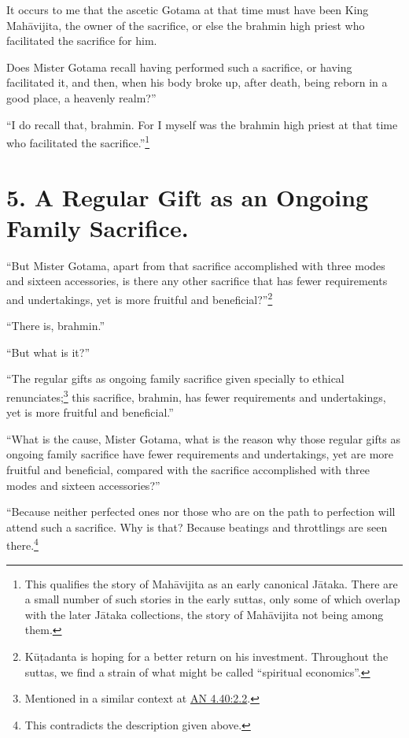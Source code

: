 \documentclass[12pt,openany]{book}%
\begin{document}
It occurs to me that the ascetic Gotama at that time must have been King \textsanskrit{Mahāvijita}, the owner of the sacrifice, or else the brahmin high priest who facilitated the sacrifice for him. 

Does Mister Gotama recall having performed such a sacrifice, or having facilitated it, and then, when his body broke up, after death, being reborn in a good place, a heavenly realm?” 

“I do recall that, brahmin. For I myself was the brahmin high priest at that time who facilitated the sacrifice.”\footnote{This qualifies the story of \textsanskrit{Mahāvijita} as an early canonical \textsanskrit{Jātaka}. There are a small number of such stories in the early suttas, only some of which overlap with the later \textsanskrit{Jātaka} collections, the story of \textsanskrit{Mahāvijita} not being among them. } 

\section*{5. A Regular Gift as an Ongoing Family Sacrifice. }

“But Mister Gotama, apart from that sacrifice accomplished with three modes and sixteen accessories, is there any other sacrifice that has fewer requirements and undertakings, yet is more fruitful and beneficial?”\footnote{\textsanskrit{Kūṭadanta} is hoping for a better return on his investment. Throughout the suttas, we find a strain of what might be called “spiritual economics”. } 

“There is, brahmin.” 

“But what is it?” 

“The regular gifts as ongoing family sacrifice given specially to ethical renunciates;\footnote{Mentioned in a similar context at \href{https://suttacentral.net/an4.40/en/sujato\#2.2}{AN 4.40:2.2}. } this sacrifice, brahmin, has fewer requirements and undertakings, yet is more fruitful and beneficial.” 

“What is the cause, Mister Gotama, what is the reason why those regular gifts as ongoing family sacrifice have fewer requirements and undertakings, yet are more fruitful and beneficial, compared with the sacrifice accomplished with three modes and sixteen accessories?” 

“Because neither perfected ones nor those who are on the path to perfection will attend such a sacrifice. Why is that? Because beatings and throttlings are seen there.\footnote{This contradicts the description given above. } 
\end{document}
